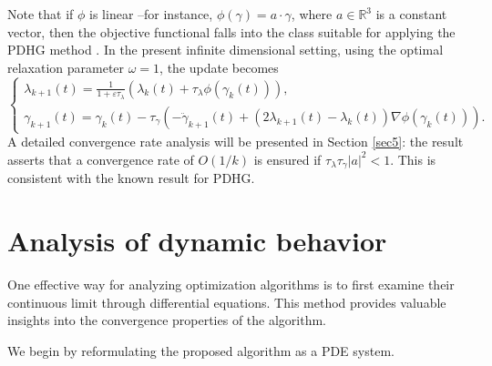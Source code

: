 \documentclass[12pt]{amsart}
\theoremstyle{definition}
\theoremstyle{remark}
\numberwithin{equation}{section}
\numberwithin{equation}{section}
\begin{document}
Note that if $\phi$ is linear --for instance,  $\phi(\gamma)=a\cdot \gamma$, where $a\in \mathbb{R}^3$ is a constant vector,  then the objective functional falls into the class suitable for applying  the PDHG method \cite{Chambolle:2011}. In the present infinite dimensional setting, using the optimal relaxation parameter $\omega=1$, the update becomes 
\begin{equation}\label{eqs:PDHG_update+}
\begin{cases}
    \lambda_{k+1}(t) = \frac{1}{1+\varepsilon\tau_{\lambda}}(\lambda_k(t)+\tau_{\lambda}\phi(\gamma_{k}(t))), \\
    \gamma_{k+1}(t) = \gamma_k(t) - \tau_{\gamma}(-\ddot{\gamma}_{k+1}(t)+(2\lambda_{k+1}(t) -\lambda_k(t)) \nabla\phi(\gamma_k(t))).
\end{cases}\end{equation}
A detailed convergence rate analysis will be presented in Section \ref{sec5}: the result asserts that a convergence rate of $O(1/k)$ is ensured if $\tau_\lambda \tau_\gamma |a|^2 <1$. This is consistent with the known result for PDHG. 

\section{Analysis of dynamic behavior}\label{sec:analysis}
One effective way for analyzing optimization algorithms is to first examine their continuous limit through differential equations. This method provides valuable insights into the convergence properties of the algorithm. 

We begin by reformulating the proposed algorithm as a PDE system. 
\end{document}
